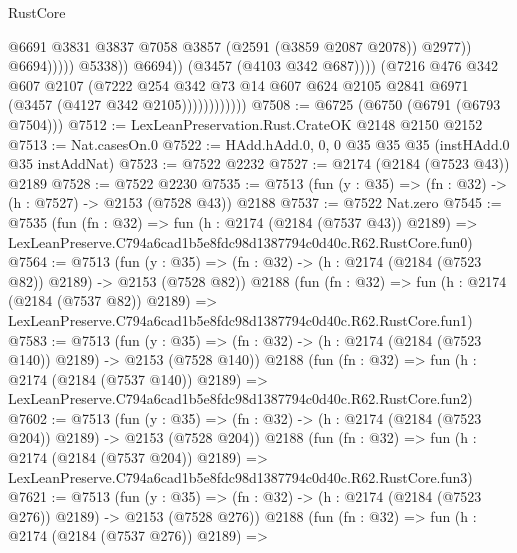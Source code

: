 \begin{lexlean}{RustCore}
\begin{coremodule}
                                              @6691
                                              @3831
                                              @3837
                                              @7058
                                              @3857
                                              (@2591 (@3859 @2087 @2078))
                                              @2977))
                                          @6694)))))
                                @5338))
                            @6694))
                        (@3457 (@4103 @342 @687))))
                    (@7216
                      @476
                      @342
                      @607
                      @2107
                      (@7222
                        @254
                        @342
                        @73
                        @14
                        @607
                        @624
                        @2105
                        @2841
                        @6971
                        (@3457 (@4127 @342 @2105))))))))))))
@7508 := @6725 (@6750 (@6791 (@6793 @7504)))
@7512 := LexLeanPreservation.Rust.CrateOK @2148 @2150 @2152
@7513 := Nat.casesOn.{0}
@7522 := HAdd.hAdd.{0, 0, 0} @35 @35 @35 (instHAdd.{0} @35 instAddNat)
@7523 := @7522 @2232
@7527 := @2174 (@2184 (@7523 @43)) @2189
@7528 := @7522 @2230
@7535 := @7513 (fun (y : @35) => (fn : @32) -> (h : @7527) -> @2153 (@7528 @43)) @2188
@7537 := @7522 Nat.zero
@7545 := @7535
    (fun (fn : @32) =>
    fun (h : @2174 (@2184 (@7537 @43)) @2189) =>
    LexLeanPreserve.C794a6cad1b5e8fdc98d1387794c0d40c.R62.RustCore.fun0)
@7564 := @7513
    (fun (y : @35) => (fn : @32) -> (h : @2174 (@2184 (@7523 @82)) @2189) -> @2153 (@7528 @82))
    @2188
    (fun (fn : @32) =>
    fun (h : @2174 (@2184 (@7537 @82)) @2189) =>
    LexLeanPreserve.C794a6cad1b5e8fdc98d1387794c0d40c.R62.RustCore.fun1)
@7583 := @7513
    (fun (y : @35) => (fn : @32) -> (h : @2174 (@2184 (@7523 @140)) @2189) -> @2153 (@7528 @140))
    @2188
    (fun (fn : @32) =>
    fun (h : @2174 (@2184 (@7537 @140)) @2189) =>
    LexLeanPreserve.C794a6cad1b5e8fdc98d1387794c0d40c.R62.RustCore.fun2)
@7602 := @7513
    (fun (y : @35) => (fn : @32) -> (h : @2174 (@2184 (@7523 @204)) @2189) -> @2153 (@7528 @204))
    @2188
    (fun (fn : @32) =>
    fun (h : @2174 (@2184 (@7537 @204)) @2189) =>
    LexLeanPreserve.C794a6cad1b5e8fdc98d1387794c0d40c.R62.RustCore.fun3)
@7621 := @7513
    (fun (y : @35) => (fn : @32) -> (h : @2174 (@2184 (@7523 @276)) @2189) -> @2153 (@7528 @276))
    @2188
    (fun (fn : @32) =>
    fun (h : @2174 (@2184 (@7537 @276)) @2189) =>

\end{coremodule}
\end{lexlean}
